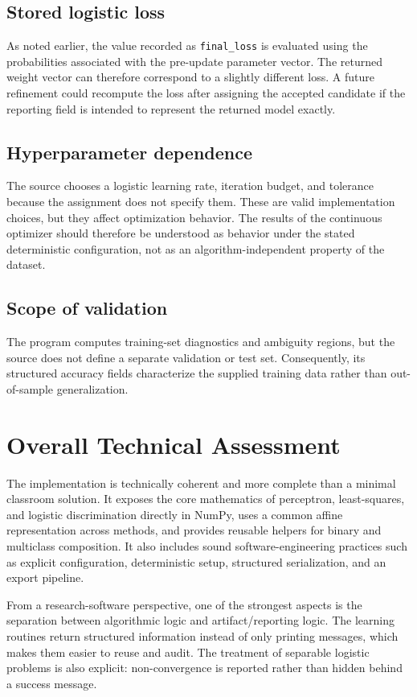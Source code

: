 \documentclass[11pt,a4paper]{article}
\newcommand{\code}[1]{\texttt{#1}}
\begin{document}
\subsection{Stored logistic loss}
As noted earlier, the value recorded as \code{final\_loss} is evaluated using the probabilities associated with the pre-update parameter vector. The returned weight vector can therefore correspond to a slightly different loss. A future refinement could recompute the loss after assigning the accepted candidate if the reporting field is intended to represent the returned model exactly.

\subsection{Hyperparameter dependence}
The source chooses a logistic learning rate, iteration budget, and tolerance because the assignment does not specify them. These are valid implementation choices, but they affect optimization behavior. The results of the continuous optimizer should therefore be understood as behavior under the stated deterministic configuration, not as an algorithm-independent property of the dataset.

\subsection{Scope of validation}
The program computes training-set diagnostics and ambiguity regions, but the source does not define a separate validation or test set. Consequently, its structured accuracy fields characterize the supplied training data rather than out-of-sample generalization.

\section{Overall Technical Assessment}
The implementation is technically coherent and more complete than a minimal classroom solution. It exposes the core mathematics of perceptron, least-squares, and logistic discrimination directly in NumPy, uses a common affine representation across methods, and provides reusable helpers for binary and multiclass composition. It also includes sound software-engineering practices such as explicit configuration, deterministic setup, structured serialization, and an export pipeline.

From a research-software perspective, one of the strongest aspects is the separation between algorithmic logic and artifact/reporting logic. The learning routines return structured information instead of only printing messages, which makes them easier to reuse and audit. The treatment of separable logistic problems is also explicit: non-convergence is reported rather than hidden behind a success message.
\end{document}
